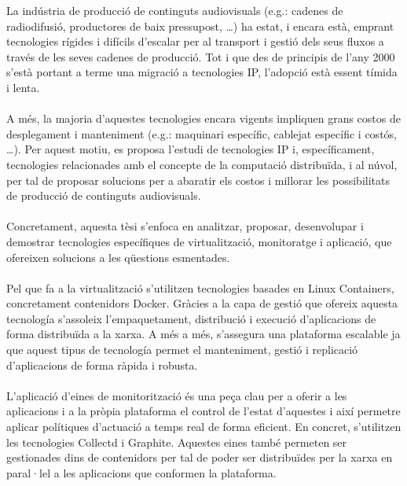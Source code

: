 \documentclass[english,final]{setup/eetac_tfc_pfc}
\begin{document}

\beforepreface  


\begin{resum}{10cm}
  La indústria de producció de continguts audiovisuals (e.g.: cadenes de radiodifusió, productores de baix pressupost, \ldots) ha estat, i encara està, emprant tecnologies rígides i difícils d'escalar per al transport i gestió dels seus fluxos a través de les seves cadenes de producció. Tot i que des de principis de l'any 2000 s'està portant a terme una migració a tecnologies IP, l'adopció està essent tímida i lenta.
  \\
  \\
  A més, la majoria d'aquestes tecnologies encara vigents impliquen grans costos de desplegament i manteniment (e.g.: maquinari específic, cablejat específic i costós, \ldots). Per aquest motiu, es proposa l'estudi de tecnologies IP i, específicament, tecnologies relacionades amb el concepte de la computació distribuïda, i al núvol, per tal de proposar solucions per a abaratir els costos i millorar les possibilitats de producció de continguts audiovisuals.
  \\
  \\
  Concretament, aquesta tèsi s'enfoca en analitzar, proposar, desenvolupar i demostrar tecnologies específiques de virtualització, monitoratge i aplicació, que ofereixen solucions a les qüestions esmentades.
  \\
  \\
  Pel que fa a la virtualització s'utilitzen tecnologies basades en Linux Containers, concretament contenidors Docker. Gràcies a la capa de gestió que ofereix aquesta tecnología s'assoleix l'empaquetament, distribució i execució d'aplicacions de forma distribuïda a la xarxa. A més a més, s'assegura una plataforma escalable ja que aquest tipus de tecnología permet el manteniment, gestió i replicació d'aplicacions de forma ràpida i robusta.
  \\
  \\
  L'aplicació d'eines de monitorització és una peça clau per a oferir a les aplicacions i a la pròpia plataforma el control de l'estat d'aquestes i així permetre aplicar polítiques d'actuació a temps real de forma eficient. En concret, s'utilitzen les tecnologies Collectd i Graphite. Aquestes eines també permeten ser gestionades dins de contenidors per tal de poder ser distribuïdes per la xarxa en paral·lel a les aplicacions que conformen la plataforma. 

\end{resum}
\end{document}
